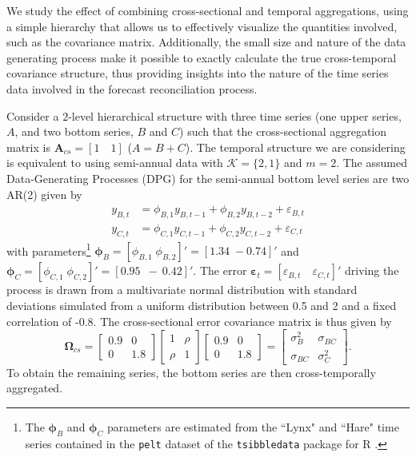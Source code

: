 \documentclass[12pt]{article}
\newcommand{\epsvet}{\bm{\varepsilon}}
\newcommand{\Avet}{\bm{A}}
\newcommand{\Omegavet}{\bm{\Omega}}
\newcommand{\phivet}{\bm{\phi}}
\theoremstyle{definition}
\begin{document}
We study the effect of combining cross-sectional and temporal aggregations, using a simple hierarchy that allows us to effectively visualize the quantities involved, such as the covariance matrix. Additionally, the small size and nature of the data generating process make it possible to exactly calculate the true cross-temporal covariance structure, thus providing insights into the nature of the time series data involved in the forecast reconciliation process.

Consider a $2$-level hierarchical structure with three time series (one upper series, $A$, and two bottom series, $B$ and $C$) such that the cross-sectional aggregation matrix is $\Avet_{cs} = \left[ 1 \quad 1 \right]$ ($A = B+C$). The temporal structure we are considering is equivalent to using semi-annual data with $\mathcal{K} = \{2,1\}$ and $m = 2$. The assumed Data-Generating Processes (DPG) for the semi-annual bottom level series are two AR(2) given by
$$
\begin{aligned}
	y_{B,t} &= \phi_{B, 1} y_{B,t-1} + \phi_{B, 2} y_{B,t-2} + \varepsilon_{B, t}\\
	y_{C,t} &= \phi_{C, 1} y_{C,t-1} + \phi_{C, 2} y_{C,t-2} + \varepsilon_{C, t}
\end{aligned}
$$
with parameters\footnote{The $\phivet_B$ and $\phivet_C$ parameters are estimated from the “Lynx" and “Hare" time series contained in the \texttt{pelt} dataset of the \texttt{tsibbledata} package for R \citep{ohara-wild2022}.} $\phivet_B = [\phi_{B,1}\; \phi_{B,2}]' = [1.34\; -0.74]'$ and $\phivet_C  = [\phi_{C,1}\; \phi_{C,2}]' = [0.95\;~-~0.42]'$. The error $\epsvet_t = \left[\varepsilon_{B, t}\quad \varepsilon_{C, t}\right]'$ driving the process is drawn from a multivariate normal distribution with standard deviations simulated from a uniform distribution between 0.5 and 2 and a fixed correlation of -0.8. The cross-sectional error covariance matrix is thus given by
$$
	\Omegavet_{cs} = \begin{bmatrix}
		0.9 & 0   \\
		0   & 1.8
	\end{bmatrix} \begin{bmatrix}
		1    & \rho \\
		\rho & 1
	\end{bmatrix} \begin{bmatrix}
		0.9 & 0   \\
		0   & 1.8
	\end{bmatrix} = \begin{bmatrix}
		\sigma_B^2  & \sigma_{BC} \\
		\sigma_{BC} & \sigma_C^2
	\end{bmatrix}.
$$
To obtain the remaining series, the bottom series are then cross-temporally aggregated.
\end{document}
